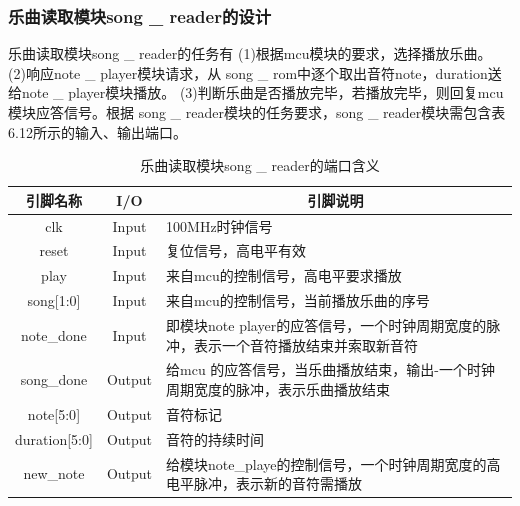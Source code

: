 \documentclass{../source/Experiment}
\begin{document}
            \subsubsection{乐曲读取模块song \_ reader的设计}

                乐曲读取模块song \_ reader的任务有
                (1)根据mcu模块的要求，选择播放乐曲。
                (2)响应note \_ player模块请求，从 song \_ rom中逐个取出音符{note，duration}送给note \_ player模块播放。
                (3)判断乐曲是否播放完毕，若播放完毕，则回复mcu模块应答信号。根据 song \_ reader模块的任务要求，song \_ reader模块需包含表6.12所示的输入、输出端口。

                \begin{table}[H]
                    \caption{乐曲读取模块song \_ reader的端口含义}
                    \begin{tabular}{|c|c|p{}|}
                        \hline
                        引脚名称              & I/O    & \multicolumn{1}{c|}{引脚说明}                        \\ \hline
                        clk               & Input  & 100MHz时钟信号                                       \\ \hline
                        reset             & Input  & 复位信号，高电平有效                                       \\ \hline
                        play              & Input  & 来自mcu的控制信号，高电平要求播放                               \\ \hline
                        song{[}1:0{]}     & Input  & 来自mcu的控制信号，当前播放乐曲的序号                             \\ \hline
                        note\_done        & Input  & 即模块note player的应答信号，一个时钟周期宽度的脉冲，表示一个音符播放结束并索取新音符 \\ \hline
                        song\_done        & Output & 给mcu 的应答信号，当乐曲播放结束，输出-一个时钟周期宽度的脉冲，表示乐曲播放结束       \\ \hline
                        note{[}5:0{]}     & Output & 音符标记                                             \\ \hline
                        duration{[}5:0{]} & Output & 音符的持续时间                                          \\ \hline
                        new\_note         & Output & 给模块note\_playe的控制信号，一个时钟周期宽度的高电平脉冲，表示新的音符需播放     \\ \hline
                    \end{tabular}
                \end{table}
\end{document}
